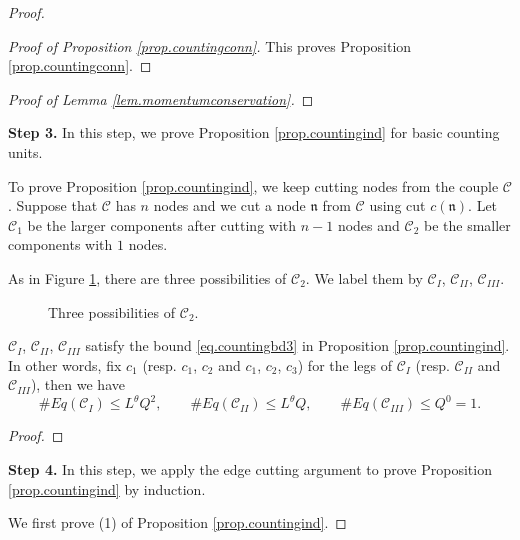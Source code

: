 \begin{proof}
\begin{proof}[Proof of Proposition \ref{prop.countingconn}]
This proves Proposition \ref{prop.countingconn}.
\end{proof}

\begin{proof}[Proof of Lemma \ref{lem.momentumconservation}]

\end{proof}

\textbf{Step 3.} In this step, we prove Proposition \ref{prop.countingind} for basic counting units.

To prove Proposition \ref{prop.countingind}, we keep cutting nodes from the couple $\mathcal{C}$. Suppose that $\mathcal{C}$ has $n$ nodes and we cut a node $\mathfrak{n}$ from $\mathcal{C}$ using cut $c(\mathfrak{n})$. Let $\mathcal{C}_1$ be the larger components after cutting with $n-1$ nodes and $\mathcal{C}_2$ be the smaller components with $1$ nodes.

As in Figure \ref{fig.3possibilities}, there are three possibilities of $\mathcal{C}_2$. We label them by $\mathcal{C}_{I}$, $\mathcal{C}_{II}$, $\mathcal{C}_{III}$.

\begin{figure}[H]
        \caption{Three possibilities of $\mathcal{C}_2$.}
        \centering
        \label{fig.3possibilities}
    \end{figure}
    
\begin{lem}\label{lem.countingbdunit}
$\mathcal{C}_{I}$, $\mathcal{C}_{II}$, $\mathcal{C}_{III}$ satisfy the bound \eqref{eq.countingbd3} in Proposition \ref{prop.countingind}. In other words, fix $c_1$ (resp. $c_1$, $c_2$ and $c_1$, $c_2$, $c_3$) for the legs of $\mathcal{C}_{I}$ (resp. $\mathcal{C}_{II}$ and $\mathcal{C}_{III}$), then we have 
\begin{equation}\label{eq.countingbdunit}
    \# Eq(\mathcal{C}_{I})\leq L^\theta Q^{2},\qquad \# Eq(\mathcal{C}_{II})\leq L^\theta Q,\qquad \# Eq(\mathcal{C}_{III})\leq Q^0=1.
\end{equation}
\end{lem}
\begin{proof}

\end{proof}

\textbf{Step 4.} In this step, we apply the edge cutting argument to prove Proposition \ref{prop.countingind} by induction.

We first prove (1) of Proposition \ref{prop.countingind}.


\end{proof}
